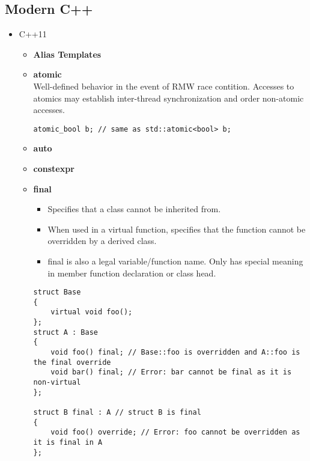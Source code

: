 \documentclass{article}
\begin{document}
\subsection{Modern C++}
\begin{itemize}
	\item C++11
	      \begin{itemize}
		      \item \textbf{Alias Templates}
		      \item \textbf{atomic} \\
			      Well-defined behavior in the event of RMW race contition. Accesses to atomics may establish inter-thread synchronization and order non-atomic accesses.
			      \begin{lstlisting}[style=cpp]
			      atomic_bool b; // same as std::atomic<bool> b;
			      \end{lstlisting}
		      \item \textbf{auto}
		      \item \textbf{constexpr}
		      \item \textbf{final} \\
			      \begin{itemize}
			      	\item Specifies that a class cannot be inherited from.
			      	\item When used in a virtual function, specifies that the function cannot be overridden by a derived class.
				\item final is also a legal variable/function name. Only has special meaning in member function declaration or class head.
			      \end{itemize}
			      \begin{lstlisting}[style=cpp]
struct Base
{
    virtual void foo();
};
struct A : Base
{
    void foo() final; // Base::foo is overridden and A::foo is the final override
    void bar() final; // Error: bar cannot be final as it is non-virtual
};
 
struct B final : A // struct B is final
{
    void foo() override; // Error: foo cannot be overridden as it is final in A
};
 

\end{lstlisting}
\end{itemize}
\end{itemize}
\end{document}
